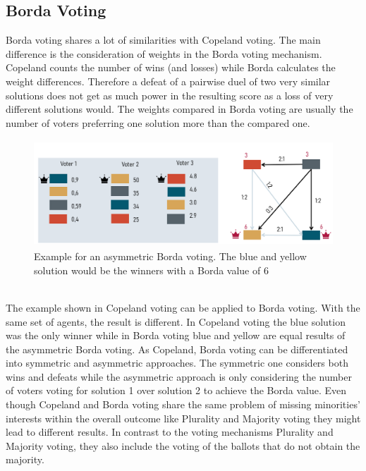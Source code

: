 \documentclass[german, a4paper, 11pt, oneside]{scrbook}
\begin{document}
\subsection{Borda Voting}
Borda voting shares a lot of similarities with Copeland voting. The main difference is the consideration of weights in the Borda voting mechanism. Copeland counts the number of wins (and losses) while Borda calculates the weight differences. \cite{FelixBrandtVincentConitzerUlleEndrissJeromeLangandArielD.Procaccia.}Therefore a defeat of a pairwise duel of two very similar solutions does not get as much power in the resulting score as a loss of very different solutions would. The weights compared in Borda voting are usually the number of voters preferring one solution more than the compared one. 
\begin{figure}[h]
\centering
\includegraphics[height=4cm]{Borda_asym}
\caption{Example for an asymmetric Borda voting. The blue and yellow solution would be the winners with a Borda value of 6}
\end{figure}
\\The example shown in Copeland voting can be applied to Borda voting. With the same set of agents, the result is different. In Copeland voting the blue solution was the only winner while in Borda voting blue and yellow are equal results of the asymmetric Borda voting. As Copeland, Borda voting can be differentiated into symmetric and asymmetric approaches. The symmetric one considers both wins and defeats while the asymmetric approach is only considering the number of voters voting for solution 1 over solution 2 to achieve the Borda value. \cite{FelixBrandtVincentConitzerUlleEndrissJeromeLangandArielD.Procaccia.}
Even though Copeland and Borda voting share the same problem of missing minorities' interests within the overall outcome like Plurality and Majority voting they might lead to different results. In contrast to the voting mechanisms Plurality and Majority voting, they also include the voting of the ballots that do not obtain the majority. 
\end{document}
